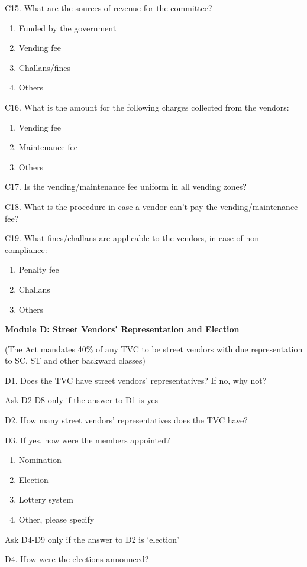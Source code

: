 \documentclass[a4paper, 12pt, twoside]{article}
\begin{document}
{{C15. What are the sources of revenue for the committee?
\begin{enumerate}
\item Funded by the government
\item Vending fee
\item Challans/fines
\item Others
\end{enumerate}


C16. What is the amount for the following charges collected from the vendors:
\begin{enumerate}
\item Vending fee
\item Maintenance fee
\item Others
\end{enumerate}


C17. Is the vending/maintenance fee uniform in all vending zones?


C18. What is the procedure in case a vendor can’t pay the vending/maintenance fee?


C19. What fines/challans are applicable to the vendors, in case of non-compliance:
\begin{enumerate}
\item Penalty fee
\item Challans
\item Others
\end{enumerate}

\textbf{Module D: Street Vendors’ Representation and Election}

(The Act mandates 40\% of any TVC to be street vendors with due representation to SC, ST and other backward classes)

D1. Does the TVC have street vendors’ representatives? If no, why not?

Ask D2-D8 only if the answer to D1 is yes

D2. How many street vendors’ representatives does the TVC have?

D3. If yes, how were the members appointed?
\begin{enumerate}
\item Nomination
\item Election
\item Lottery system
\item Other, please specify
\end{enumerate}

Ask D4-D9 only if the answer to D2 is ‘election’

D4. How were the elections announced?

}}
\end{document}
